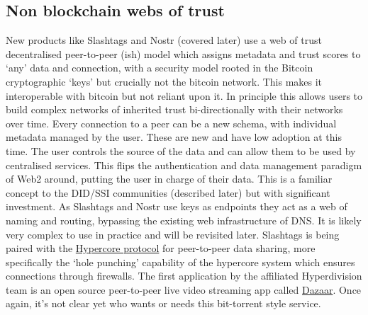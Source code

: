 \subsection{Non blockchain webs of trust}
New products like Slashtags and Nostr (covered later) use a web of trust decentralised peer-to-peer (ish) model which assigns metadata and trust scores to `any' data and connection, with a security model rooted in the Bitcoin cryptographic `keys' but crucially not the bitcoin network. This makes it interoperable with bitcoin but not reliant upon it. In principle this allows users to build complex networks of inherited trust bi-directionally with their networks over time. Every connection to a peer can be a new schema, with individual metadata managed by the user. These are new and have low adoption at this time. The user controls the source of the data and can allow them to be used by centralised services. This flips the authentication and data management paradigm of Web2 around, putting the user in charge of their data. This is a familiar concept to the DID/SSI communities (described later) but with significant investment. As Slashtags and Nostr use keys as endpoints they act as a web of naming and routing, bypassing the existing web infrastructure of DNS. It is likely very complex to use in practice and will be revisited later. Slashtags is being paired with the \href{https://hypercore-protocol.org/}{Hypercore protocol} for peer-to-peer data sharing, more specifically the `hole punching' capability of the hypercore system which ensures connections through firewalls\cite{ford2005peer}. The first application by the affiliated Hyperdivision team is an open source peer-to-peer live video streaming app called \href{https://dazaar.com/}{Dazaar}. Once again, it's not clear yet who wants or needs this bit-torrent style service. 
